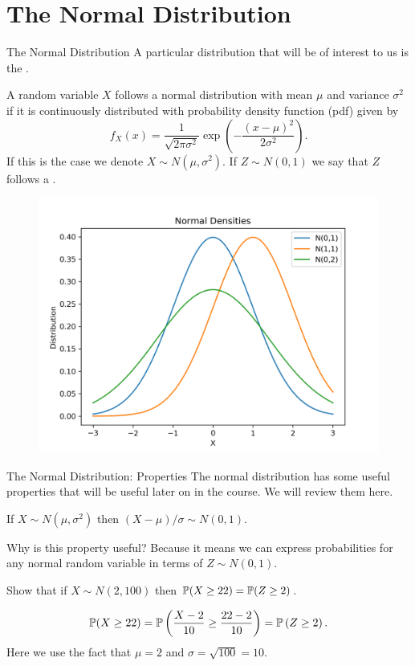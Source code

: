 \documentclass[notheorems,9pt]{beamer}
\begin{document}
\section{The Normal Distribution}
\begin{frame}{The Normal Distribution} 
	\label{frame:nd-into}
	A particular distribution that will be of interest to us is the .
	\begin{definition}
		\label{def:nd}
		A random variable \(X\) follows a normal distribution with mean \(\mu\) and variance \(\sigma^2\) if it is continuously distributed with probability density function (pdf) given by 
		\begin{equation}
			f_X(x) = \frac{1}{\sqrt{2\pi\sigma^2}}\exp\left(-\frac{(x-\mu)^2}{2\sigma^2}\right)
		.\end{equation} 
		If this is the case we denote \(X\sim N(\mu,\sigma^2)\). If \(Z\sim N(0,1)\) we say that \(Z\) follows a .	
	\end{definition}
	\begin{figure}[htpb]
		\centering
		\includegraphics[width=0.4\linewidth]{normal-density.png}	
	\end{figure}
\end{frame}
\begin{frame}{The Normal Distribution: Properties} 
	\label{frame:nd-properties}
	The normal distribution has some useful properties that will be useful later on in the course. We will review them here.
	
	 If \(X\sim N(\mu,\sigma^2)\) then \((X-\mu)/\sigma\sim N(0,1)\).

	Why is this property useful? Because it means we can express probabilities for any normal random variable in terms of \(Z\sim N(0,1)\).

	 Show that if \(X\sim N(2,100)\) then \(\P(X\geq 22) = \P(Z\geq 2)\).

	\[
		\P(X\geq 22) = \P\left(\frac{X-2}{10} \geq \frac{22 -2}{10} \right) = \P\left(Z \geq 2\right) 
	.\] 
	Here we use the fact that \(\mu=2\) and \(\sigma = \sqrt{100} = 10\).
\end{frame}
\end{document}
